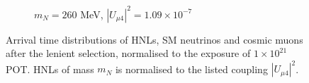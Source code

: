\begin{figure}[hb!]
\begin{subfigure}[b]{0.495\textwidth}
            \caption{$m_N = 260$ MeV, $|U_{\mu4}|^2 = 1.09 \times 10^{-7}$ }
        \end{subfigure}
        \caption[Lenient Arrival Time Distributions in the Mass Range 180 - 260 MeV]{
	Arrival time distributions of HNLs, SM neutrinos and cosmic muons after the lenient selection, normalised to the exposure of $1 \times 10^{21}$ POT.
	HNLs of mass $m_N$ is normalised to the listed coupling $|U_{\mu4}|^2$.
	}
\end{figure}

